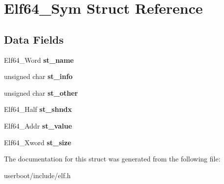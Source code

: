 \hypertarget{structElf64__Sym}{}\section{Elf64\+\_\+\+Sym Struct Reference}
\label{structElf64__Sym}
\subsection*{Data Fields}
\begin{DoxyCompactItemize}
\item 
Elf64\+\_\+\+Word {\bfseries st\+\_\+name}\hypertarget{structElf64__Sym_a4069f9db0c91ecc40bc2f4ddbdf28aff}{}\label{structElf64__Sym_a4069f9db0c91ecc40bc2f4ddbdf28aff}

\item 
unsigned char {\bfseries st\+\_\+info}\hypertarget{structElf64__Sym_a9bbd53b13b0f1403d8369cbdd15df08c}{}\label{structElf64__Sym_a9bbd53b13b0f1403d8369cbdd15df08c}

\item 
unsigned char {\bfseries st\+\_\+other}\hypertarget{structElf64__Sym_adba66dcdbe19ab3ecc24830a58549230}{}\label{structElf64__Sym_adba66dcdbe19ab3ecc24830a58549230}

\item 
Elf64\+\_\+\+Half {\bfseries st\+\_\+shndx}\hypertarget{structElf64__Sym_a3bd895ed278935218da81c754460d8d2}{}\label{structElf64__Sym_a3bd895ed278935218da81c754460d8d2}

\item 
Elf64\+\_\+\+Addr {\bfseries st\+\_\+value}\hypertarget{structElf64__Sym_a9601295da4c2e81cc18c1f777609e1bf}{}\label{structElf64__Sym_a9601295da4c2e81cc18c1f777609e1bf}

\item 
Elf64\+\_\+\+Xword {\bfseries st\+\_\+size}\hypertarget{structElf64__Sym_af5c72e0a09802b81e8087b303ec4d29f}{}\label{structElf64__Sym_af5c72e0a09802b81e8087b303ec4d29f}

\end{DoxyCompactItemize}


The documentation for this struct was generated from the following file\+:\begin{DoxyCompactItemize}
\item 
userboot/include/elf.\+h\end{DoxyCompactItemize}
